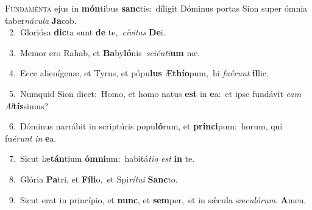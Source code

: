 \lettrine{\initial\textcolor{\initialcolor}{F}}{undaménta} ejus in \textbf{món}\-tibus \textbf{sanc}\-tis:~\star díligit Dóminus portas Sion super ómnia taber\-\textit{ná}\-\textit{cu}\textit{la} \textbf{Ja}\-cob.\\
{\numbfont\textcolor{\numbcolor}{~2.}}~Gloriósa \textbf{dic}\-ta sunt \textbf{de} te,~\star \textit{cí}\-\textit{vi}\textit{tas} \textbf{De}\-i.\par
{\numbfont\textcolor{\numbcolor}{~3.}}~Memor ero Rahab, et \textbf{Ba}\-by\-\textbf{ló}\-nis~\star \textit{sci}\-\textit{én}\textit{ti}\textbf{um} me.\par
{\numbfont\textcolor{\numbcolor}{~4.}}~Ecce alienígenæ, et Tyrus, et pópu\textbf{lus} Æ\-\textbf{thí}\-\textbf{o}pum,~\star hi \textit{fu}\-\textit{é}\textit{runt} \textbf{il}\-lic.\par
{\numbfont\textcolor{\numbcolor}{~5.}}~Numquid Sion dicet:~\dagger Homo, et homo natus \textbf{est} in \textbf{e}\-a:~\star et ipse fundávit \textit{e}\-\textit{am} \textit{Al}\-\textbf{tís}simus?\par
{\numbfont\textcolor{\numbcolor}{~6.}}~Dóminus narrábit in scriptúris popu\-\textbf{ló}\-rum, et \textbf{prín}\-\textbf{ci}pum:~\star horum, qui fu\-\textit{é}\-\textit{runt} \textit{in} \textbf{e}\-a.\par
{\numbfont\textcolor{\numbcolor}{~7.}}~Sicut læ\-\textbf{tán}\-tium \textbf{óm}\-\textbf{ni}um:~\star habitá\-\textit{ti}\-\textit{o} \textit{est} \textbf{in} te.\par
{\numbfont\textcolor{\numbcolor}{~8.}}~Glória \textbf{Pa}\-tri, et \textbf{Fí}\-\textbf{li}o,~\star et Spi\-\textit{rí}\-\textit{tu}\textit{i} \textbf{Sanc}\-to.\par
{\numbfont\textcolor{\numbcolor}{~9.}}~Sicut erat in princípio, et \textbf{nunc}\-, et \textbf{sem}\-per,~\star et in sǽcula sæ\-\textit{cu}\-\textit{ló}\textit{rum}. \textbf{A}\-men.\par
